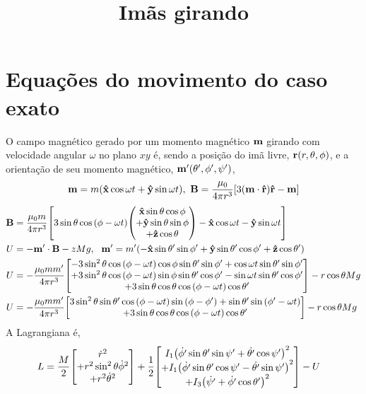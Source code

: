 \documentclass[a4paper, 12pt]{article}
\title{\textbf{Imãs girando}}
\newcommand{\hvb}[1]{\vb{\hat{#1}}}
\begin{document}
\maketitle

\section{Equações do movimento do caso exato}

O campo magnético gerado por um momento magnético $\vb m$ girando com velocidade angular $\omega$ no plano $xy$ é, sendo a posição do imã 
livre, $\vb r\qty(r, \theta, \phi)$, e a orientação de seu momento magnético, $\vb m'\qty(\theta', \phi', \psi')$,
$$\vb m = m \qty(\hvb x\cos\omega t+\hvb y\sin\omega t),\ \vb B = \frac{\mu_0}{4\pi r^3}\qty[3\qty(\vb m \cdot\hvb r)\hvb r-\vb m]$$
\begin{align}
    \vb B &= \frac{\mu_0 m}{4\pi r^3}\qty[3\sin\theta\cos\qty(\phi -\omega t)\mqty(\hvb x\sin\theta\cos\phi\\
    +\hvb y\sin\theta\sin\phi\\ +\hvb z\cos\theta)-\hvb x\cos\omega t-\hvb y\sin\omega t]\nonumber\\
    U&=-\vb m'\cdot\vb B-zMg,\ \ \vb m'=m'\qty(-\hvb x\sin\theta'\sin\phi'+\hvb y\sin\theta'\cos\phi'+\hvb z\cos\theta')\nonumber\\
    U&=-\frac{\mu_0mm'}{4\pi r^3}\mqty[-3\sin^2\theta\cos\qty(\phi-\omega t)\cos\phi\sin\theta'\sin\phi'+\cos\omega t\sin\theta'\sin\phi'\\
    +3\sin^2\theta\cos\qty(\phi-\omega t)\sin\phi\sin\theta'\cos\phi'-\sin\omega t\sin\theta'\cos\phi'\\
    +3\sin\theta\cos\theta\cos\qty(\phi-\omega t)\cos\theta']-r\cos\theta Mg\nonumber\\
    U&=-\frac{\mu_0mm'}{4\pi r^3}\mqty[3\sin^2\theta\sin\theta'\cos\qty(\phi-\omega t)\sin\qty(\phi-\phi')+\sin\theta'\sin\qty(\phi'-\omega t)
    \\+3\sin\theta\cos\theta\cos\qty(\phi-\omega t)\cos\theta']-r\cos\theta Mg\nonumber
\end{align}
A Lagrangiana é,
\begin{align}
    L&=\frac{M}{2}\mqty[\dot{r}^2\\+r^2\sin^2\theta\dot{\phi}^2\\+r^2\dot{\theta}^2]+\frac12\mqty[I_1\qty(\dot{\phi'}\sin\theta'\sin\psi'+\dot{\theta'}\cos\psi')^2\\
    +I_1\qty(\dot{\phi'}\sin\theta'\cos\psi'-\dot{\theta'}\sin\psi')^2\\+I_3\qty(\dot{\psi'}+\dot{\phi'}\cos\theta')^2]-U\nonumber
\end{align}
\end{document}
